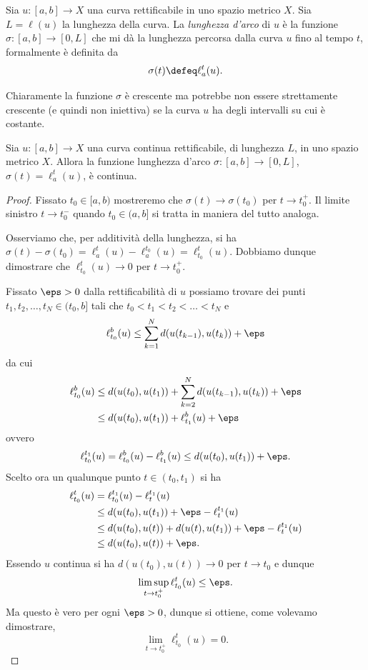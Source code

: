 \begin{definition}
Sia $u \colon [a,b] \to X$ una curva rettificabile in uno spazio metrico $X$.
Sia $L = \ell(u)$ la lunghezza della curva.
La \emph{lunghezza d'arco} di $u$ è la funzione $\sigma\colon [a,b] \to [0,L]$ 
che mi dà la lunghezza percorsa dalla curva $u$ 
fino al tempo $t$, formalmente è definita da
\begin{equation}\label{def:lunghezza_arco}
  \sigma(t) \defeq \ell_a^t(u).
\end{equation}
\end{definition}

Chiaramente la funzione $\sigma$ è crescente ma potrebbe non essere strettamente crescente 
(e quindi non iniettiva) se la curva $u$ ha degli intervalli su cui è costante.

\begin{theorem}
Sia $u \colon [a,b] \to X$ una curva continua rettificabile, di lunghezza $L$, 
in uno spazio metrico $X$.
Allora la funzione lunghezza d'arco $\sigma\colon [a,b] \to [0,L]$,
$\sigma(t) = \ell_a^t(u)$,
è continua.
\end{theorem}
\begin{proof}
Fissato $t_0\in [a,b)$
mostreremo che $\sigma(t)\to \sigma(t_0)$ per $t\to t_0^+$. Il limite sinistro $t\to t_0^-$ 
quando $t_0\in(a,b]$ si tratta 
in maniera del tutto analoga.

Osserviamo che, per additività della lunghezza, si ha 
$\sigma(t) - \sigma(t_0) = \ell_a^t(u) - \ell_a^{t_0}(u) = \ell_{t_0}^t(u)$.
Dobbiamo dunque dimostrare che $\ell_{t_0}^t(u) \to 0$ per $t\to t_0^+$.

Fissato $\eps>0$ dalla rettificabilità di $u$ 
possiamo trovare dei punti $t_1, t_2, \dots, t_N \in (t_0,b]$
tali che $t_0 < t_1 < t_2 < \dots < t_N$ e
\[
\ell_{t_0}^b(u) 
\le \sum_{k=1}^N d(u(t_{k-1}), u(t_k)) + \eps
\]
da cui
\begin{align*}
\ell_{t_0}^b(u) 
   &\le d(u(t_0), u(t_1)) + \sum_{k=2}^N d(u(t_{k-1}), u(t_k)) + \eps \\
   &\le d(u(t_0), u(t_1)) + \ell_{t_1}^b(u) + \eps
\end{align*}
ovvero
\[
  \ell_{t_0}^{t_1}(u) = \ell_{t_0}^b(u) - \ell_{t_1}^b(u) \le d(u(t_0), u(t_1)) + \eps.
\]
Scelto ora un qualunque punto $t\in (t_0, t_1)$ si ha
\begin{align*}
  \ell_{t_0}^t(u) 
    &= \ell_{t_0}^{t_1}(u) - \ell_t^{t_1}(u) \\
    &\le d(u(t_0), u(t_1)) + \eps - \ell_t^{t_1}(u) \\
    &\le d(u(t_0), u(t)) + d(u(t), u(t_1)) + \eps - \ell_t^{t_1}(u) \\
    &\le d(u(t_0), u(t)) + \eps.
\end{align*}
Essendo $u$ continua si ha $d(u(t_0), u(t)) \to 0$ per $t \to t_0$ 
e dunque
\[
\limsup_{t\to t_0^+} \ell_{t_0}^t(u) \le \eps.
\]
Ma questo è vero per ogni $\eps>0$, dunque si ottiene, come volevamo dimostrare,
\[
\lim_{t\to t_0^+} \ell_{t_0}^t(u) = 0.
\]
\end{proof}

